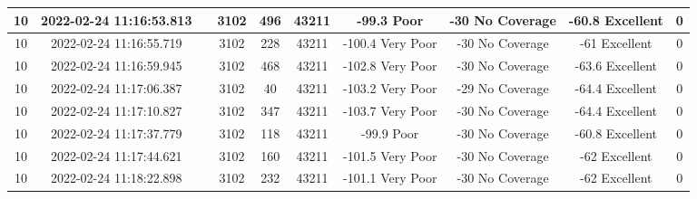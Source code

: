 \begin{longtable*}{|c|c|c|c|c|c|c|c|c|c|}
10&2022-02-24 11:16:53.813&&3102&496&43211& -99.3     Poor        & -30       No Coverage & -60.8     Excellent   & 0\\\hline
{}10&2022-02-24 11:16:55.719&&3102&228&43211& -100.4    Very Poor   & -30       No Coverage & -61       Excellent   & 0\\\hline
{}10&2022-02-24 11:16:59.945&&3102&468&43211& -102.8    Very Poor   & -30       No Coverage & -63.6     Excellent   & 0\\\hline
{}10&2022-02-24 11:17:06.387&&3102&40&43211& -103.2    Very Poor   & -29       No Coverage & -64.4     Excellent   & 0\\\hline
{}10&2022-02-24 11:17:10.827&&3102&347&43211& -103.7    Very Poor   & -30       No Coverage & -64.4     Excellent   & 0\\\hline
{}10&2022-02-24 11:17:37.779&&3102&118&43211& -99.9     Poor        & -30       No Coverage & -60.8     Excellent   & 0\\\hline
{}10&2022-02-24 11:17:44.621&&3102&160&43211& -101.5    Very Poor   & -30       No Coverage & -62       Excellent   & 0\\\hline
{}10&2022-02-24 11:18:22.898&&3102&232&43211& -101.1    Very Poor   & -30       No Coverage & -62       Excellent   & 0\\\hline

\end{longtable*}
